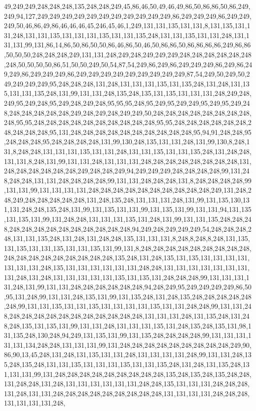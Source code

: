49,249,249,248,248,248,135,248,248,249,45,86,46,50,49,46,49,86,50,86,86,50,86,249,249,94,127,249,249,249,249,249,249,249,249,249,249,249,86,249,249,249,86,249,249,249,50,46,86,49,86,46,46,46,45,246,45,46,1,249,131,131,135,131,131,8,131,135,131,131,248,131,131,135,131,131,131,135,131,131,135,248,131,131,135,131,131,248,131,131,131,99,131,86,14,86,50,86,50,50,86,46,86,50,46,50,86,86,50,86,86,86,86,249,86,86,50,50,50,248,248,248,249,131,131,248,249,248,249,249,249,248,248,248,248,248,248,248,50,50,50,50,86,51,50,50,249,50,54,87,54,249,86,249,86,249,249,249,86,249,86,249,249,86,249,249,249,86,249,249,249,249,249,249,249,249,249,87,54,249,50,249,50,249,249,249,249,95,248,248,248,131,248,131,131,131,135,131,135,248,131,248,131,135,131,131,135,248,131,99,131,131,248,135,248,135,131,135,131,131,131,248,249,248,249,95,249,248,95,249,248,249,248,95,95,95,248,95,249,95,249,249,95,249,95,249,248,248,248,248,248,248,249,248,249,248,249,249,50,248,248,248,248,248,248,248,248,248,95,95,248,248,248,248,248,248,248,248,248,248,95,95,248,248,248,248,248,248,248,248,248,248,95,131,248,248,248,248,248,248,248,248,248,248,95,94,91,248,248,95,248,248,248,95,248,248,248,248,131,99,130,248,135,131,131,248,131,99,130,8,248,131,8,248,248,131,131,131,135,131,131,248,131,131,135,131,131,135,248,131,248,248,131,131,8,248,131,99,131,131,248,131,131,131,248,248,248,248,248,248,248,248,131,248,248,248,248,248,248,249,248,248,249,94,249,249,249,248,248,248,248,99,131,248,248,248,131,131,248,248,248,248,99,131,131,248,248,248,131,8,248,248,248,248,99,131,131,99,131,131,131,131,248,248,248,248,248,248,248,248,248,248,249,131,248,248,249,248,248,248,248,248,131,248,135,248,131,131,131,248,131,99,131,135,130,131,131,248,248,135,248,131,99,131,135,131,131,99,131,135,131,99,131,131,94,131,135,131,135,131,99,131,248,248,131,131,131,135,131,248,131,99,131,131,135,248,248,248,248,248,248,248,248,248,248,248,248,248,94,249,248,249,249,249,54,248,248,248,248,131,131,135,248,131,248,131,248,248,135,131,131,131,8,248,8,248,8,248,131,135,131,135,131,131,135,131,131,135,131,99,131,8,248,248,248,248,248,248,248,248,248,248,248,248,248,248,248,248,248,248,135,248,131,248,135,131,135,131,131,131,131,131,131,131,248,135,131,131,131,131,131,131,248,248,131,131,131,131,131,131,131,131,248,131,248,131,131,131,131,131,135,131,135,131,248,248,248,99,131,131,131,131,248,131,99,131,131,248,248,248,248,248,248,94,248,249,95,249,249,249,249,86,50,95,131,248,99,131,131,248,135,131,99,131,135,248,131,248,135,248,248,248,248,248,248,99,131,131,135,131,131,135,131,131,131,131,135,131,131,248,248,99,131,131,248,248,248,248,248,248,248,248,248,248,248,248,131,131,131,248,131,135,248,131,248,248,135,131,135,131,99,131,131,248,131,131,131,135,131,248,135,248,135,131,98,131,135,248,130,248,94,249,131,135,131,99,131,135,248,248,248,248,99,131,131,131,131,131,134,248,248,131,131,131,99,131,248,248,248,248,248,248,248,248,248,249,90,86,90,13,45,248,131,248,131,135,131,131,248,131,131,131,131,248,99,131,131,248,135,248,135,248,131,131,135,131,131,131,135,131,131,135,248,131,248,131,135,248,131,131,131,99,131,248,248,248,248,248,248,248,248,248,135,248,135,248,135,248,248,131,248,248,131,248,131,131,131,131,131,131,248,248,135,131,131,131,248,248,248,131,248,131,131,248,248,248,248,248,248,248,248,248,131,131,131,131,248,248,248,131,131,131,131,248,